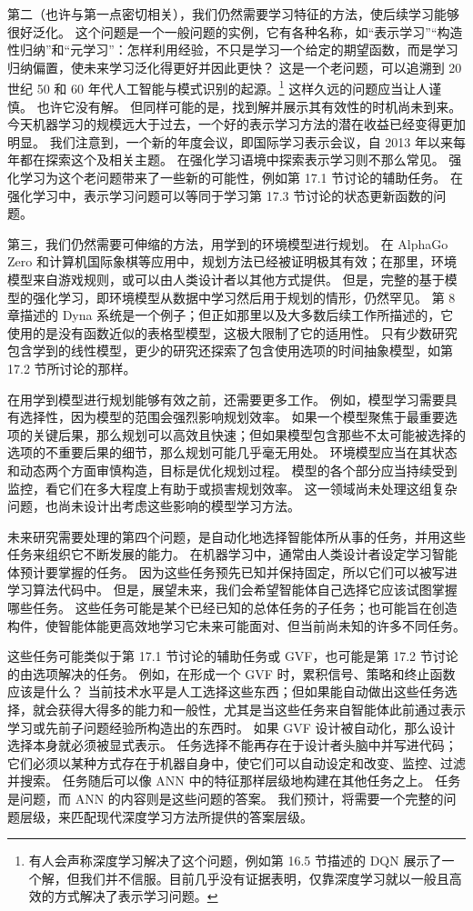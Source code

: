 \documentclass[UTF8,12pt,a4paper,fontset=fandol]{ctexart}
\begin{document}
第二（也许与第一点密切相关），我们仍然需要学习特征的方法，使后续学习能够很好泛化。
这个问题是一个一般问题的实例，它有各种名称，如“表示学习”“构造性归纳”和“元学习”：怎样利用经验，不只是学习一个给定的期望函数，而是学习归纳偏置，使未来学习泛化得更好并因此更快？
这是一个老问题，可以追溯到 20 世纪 50 和 60 年代人工智能与模式识别的起源。\footnote{有人会声称深度学习解决了这个问题，例如第 16.5 节描述的 DQN 展示了一个解，但我们并不信服。目前几乎没有证据表明，仅靠深度学习就以一般且高效的方式解决了表示学习问题。}
这样久远的问题应当让人谨慎。
也许它没有解。
但同样可能的是，找到解并展示其有效性的时机尚未到来。
今天机器学习的规模远大于过去，一个好的表示学习方法的潜在收益已经变得更加明显。
我们注意到，一个新的年度会议，即国际学习表示会议，自 2013 年以来每年都在探索这个及相关主题。
在强化学习语境中探索表示学习则不那么常见。
强化学习为这个老问题带来了一些新的可能性，例如第 17.1 节讨论的辅助任务。
在强化学习中，表示学习问题可以等同于学习第 17.3 节讨论的状态更新函数的问题。

第三，我们仍然需要可伸缩的方法，用学到的环境模型进行规划。
在 AlphaGo Zero 和计算机国际象棋等应用中，规划方法已经被证明极其有效；在那里，环境模型来自游戏规则，或可以由人类设计者以其他方式提供。
但是，完整的基于模型的强化学习，即环境模型从数据中学习然后用于规划的情形，仍然罕见。
第 8 章描述的 Dyna 系统是一个例子；但正如那里以及大多数后续工作所描述的，它使用的是没有函数近似的表格型模型，这极大限制了它的适用性。
只有少数研究包含学到的线性模型，更少的研究还探索了包含使用选项的时间抽象模型，如第 17.2 节所讨论的那样。

在用学到模型进行规划能够有效之前，还需要更多工作。
例如，模型学习需要具有选择性，因为模型的范围会强烈影响规划效率。
如果一个模型聚焦于最重要选项的关键后果，那么规划可以高效且快速；但如果模型包含那些不太可能被选择的选项的不重要后果的细节，那么规划可能几乎毫无用处。
环境模型应当在其状态和动态两个方面审慎构造，目标是优化规划过程。
模型的各个部分应当持续受到监控，看它们在多大程度上有助于或损害规划效率。
这一领域尚未处理这组复杂问题，也尚未设计出考虑这些影响的模型学习方法。

未来研究需要处理的第四个问题，是自动化地选择智能体所从事的任务，并用这些任务来组织它不断发展的能力。
在机器学习中，通常由人类设计者设定学习智能体预计要掌握的任务。
因为这些任务预先已知并保持固定，所以它们可以被写进学习算法代码中。
但是，展望未来，我们会希望智能体自己选择它应该试图掌握哪些任务。
这些任务可能是某个已经已知的总体任务的子任务；也可能旨在创造构件，使智能体能更高效地学习它未来可能面对、但当前尚未知的许多不同任务。

这些任务可能类似于第 17.1 节讨论的辅助任务或 GVF，也可能是第 17.2 节讨论的由选项解决的任务。
例如，在形成一个 GVF 时，累积信号、策略和终止函数应该是什么？
当前技术水平是人工选择这些东西；但如果能自动做出这些任务选择，就会获得大得多的能力和一般性，尤其是当这些任务来自智能体此前通过表示学习或先前子问题经验所构造出的东西时。
如果 GVF 设计被自动化，那么设计选择本身就必须被显式表示。
任务选择不能再存在于设计者头脑中并写进代码；它们必须以某种方式存在于机器自身中，使它们可以自动设定和改变、监控、过滤并搜索。
任务随后可以像 ANN 中的特征那样层级地构建在其他任务之上。
任务是问题，而 ANN 的内容则是这些问题的答案。
我们预计，将需要一个完整的问题层级，来匹配现代深度学习方法所提供的答案层级。
\end{document}
